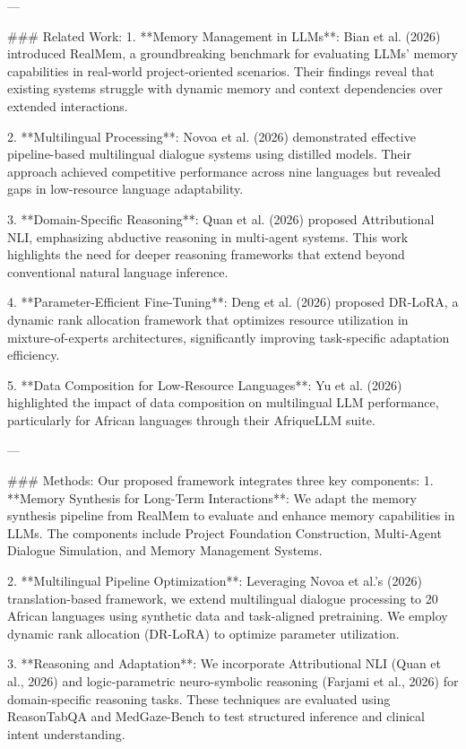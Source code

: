 ---

### Related Work:
1. **Memory Management in LLMs**: Bian et al. (2026) introduced RealMem, a groundbreaking benchmark for evaluating LLMs' memory capabilities in real-world project-oriented scenarios. Their findings reveal that existing systems struggle with dynamic memory and context dependencies over extended interactions.
   
2. **Multilingual Processing**: Novoa et al. (2026) demonstrated effective pipeline-based multilingual dialogue systems using distilled models. Their approach achieved competitive performance across nine languages but revealed gaps in low-resource language adaptability.

3. **Domain-Specific Reasoning**: Quan et al. (2026) proposed Attributional NLI, emphasizing abductive reasoning in multi-agent systems. This work highlights the need for deeper reasoning frameworks that extend beyond conventional natural language inference.

4. **Parameter-Efficient Fine-Tuning**: Deng et al. (2026) proposed DR-LoRA, a dynamic rank allocation framework that optimizes resource utilization in mixture-of-experts architectures, significantly improving task-specific adaptation efficiency.

5. **Data Composition for Low-Resource Languages**: Yu et al. (2026) highlighted the impact of data composition on multilingual LLM performance, particularly for African languages through their AfriqueLLM suite.

---

### Methods:
Our proposed framework integrates three key components: 
1. **Memory Synthesis for Long-Term Interactions**:
   We adapt the memory synthesis pipeline from RealMem to evaluate and enhance memory capabilities in LLMs. The components include Project Foundation Construction, Multi-Agent Dialogue Simulation, and Memory Management Systems.

2. **Multilingual Pipeline Optimization**:
   Leveraging Novoa et al.’s (2026) translation-based framework, we extend multilingual dialogue processing to 20 African languages using synthetic data and task-aligned pretraining. We employ dynamic rank allocation (DR-LoRA) to optimize parameter utilization.

3. **Reasoning and Adaptation**:
   We incorporate Attributional NLI (Quan et al., 2026) and logic-parametric neuro-symbolic reasoning (Farjami et al., 2026) for domain-specific reasoning tasks. These techniques are evaluated using ReasonTabQA and MedGaze-Bench to test structured inference and clinical intent understanding.

